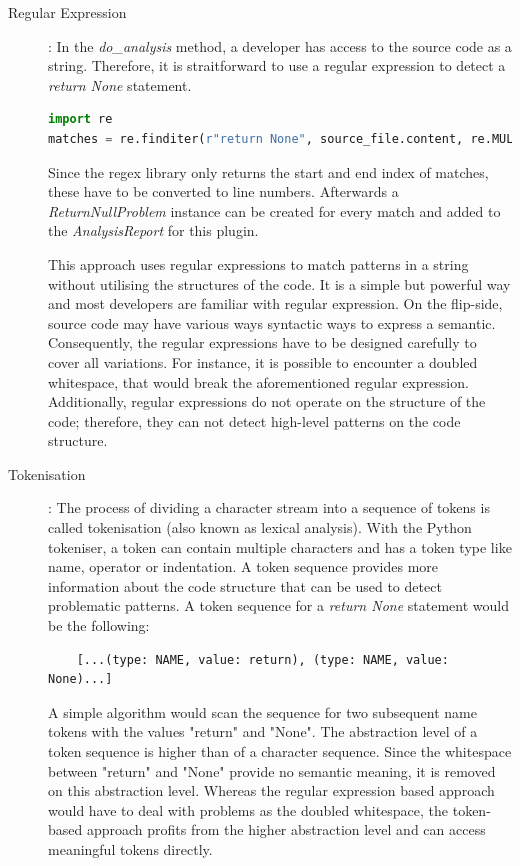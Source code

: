 \begin{description}
    \item[Regular Expression]: In the \textit{do\_analysis} method, a developer has access to the source code as a string. Therefore, it is straitforward to use a regular expression to detect a \textit{return None} statement.
    \begin{lstlisting}[language=Python]
import re
matches = re.finditer(r"return None", source_file.content, re.MULTILINE | re.DOTALL) \end{lstlisting}
    Since the regex library only returns the start and end index of matches, these have to be converted to line numbers. Afterwards a \textit{ReturnNullProblem} instance can be created for every match and added to the \textit{AnalysisReport} for this plugin.

    This approach uses regular expressions to match patterns in a string without utilising the structures of the code. It is a simple but powerful way and most developers are familiar with regular expression. On the flip-side, source code may have various ways syntactic ways to express a semantic. Consequently, the regular expressions have to be designed carefully to cover all variations. For instance, it is possible to encounter a doubled whitespace, that would break the aforementioned regular expression. Additionally, regular expressions do not operate on the structure of the code; therefore, they can not detect high-level patterns on the code structure.
    \item[Tokenisation]: The process of dividing a character stream into a sequence of tokens is called tokenisation (also known as lexical analysis). With the Python tokeniser, a token can contain multiple characters and has a token type like name, operator or indentation. A token sequence provides more information about the code structure that can be used to detect problematic patterns. 
    A token sequence for a \textit{return None} statement would be the following: 
    \begin{lstlisting}
    [...(type: NAME, value: return), (type: NAME, value: None)...]
    \end{lstlisting}
    A simple algorithm would scan the sequence for two subsequent name tokens with the values "return" and "None". The abstraction level of a token sequence is higher than of a character sequence. Since the whitespace between "return" and "None" provide no semantic meaning, it is removed on this abstraction level. Whereas the regular expression based approach would have to deal with problems as the doubled whitespace, the token-based approach profits from the higher abstraction level and can access meaningful tokens directly.

\end{description}
